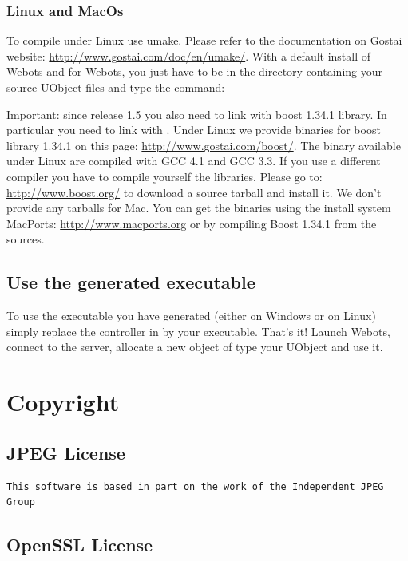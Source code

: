 \subsubsection{Linux and MacOs}

To compile under Linux use umake. Please refer to the documentation on
Gostai website: \url{http://www.gostai.com/doc/en/umake/}.  With a
default install of Webots and \urbi for Webots, you just have to be in
the directory containing your source UObject files and type the
command:


Important: since release 1.5 you also need to link with boost 1.34.1
library.  In particular you need to link with
. Under Linux we provide binaries for boost
library 1.34.1 on this page: \url{http://www.gostai.com/boost/}. The
binary available under Linux are compiled with GCC 4.1 and GCC 3.3. If
you use a different compiler you have to compile yourself the
libraries. Please go to: \url{http://www.boost.org/} to download a
source tarball and install it.  We don't provide any tarballs for
Mac. You can get the binaries using the install system MacPorts:
\url{http://www.macports.org} or by compiling Boost 1.34.1 from the
sources.


\subsection{Use the generated executable}

To use the executable you have generated (either  on
Windows or  on Linux) simply replace the \urbi
controller in  by your
executable. That's it! Launch Webots, connect to the \urbi server,
allocate a new object of type your UObject and use it.

\section{Copyright}



\subsection{JPEG License}

\begin{lstlisting}[language={},basicstyle=\ttfamily\footnotesize]
This software is based in part on the work of the Independent JPEG Group
\end{lstlisting}

\subsection{OpenSSL License}


